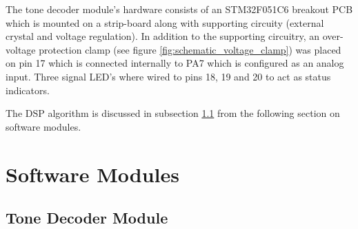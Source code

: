 The tone decoder module's hardware consists of an STM32F051C6 breakout PCB which is mounted on a strip-board along with supporting circuity (external crystal and voltage regulation). In addition to the supporting circuitry, an over-voltage protection clamp (see figure \ref{fig:schematic_voltage_clamp}) was placed on pin 17 which is connected internally to PA7 which is configured as an analog input. Three signal LED's where wired to pins 18, 19 and 20 to act as status indicators.

The DSP algorithm is discussed in subsection \ref{tone_decoder_software} from the following section on software modules.






\section{Software Modules}

\subsection{Tone Decoder Module}
\label{tone_decoder_software}
